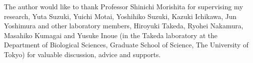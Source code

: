 The author would like to thank Professor Shinichi Morishita for supervising my research, Yuta Suzuki, Yuichi Motai, Yoshihiko Suzuki, Kazuki Ichikawa, Jun Yoshimura and other laboratory members, Hiroyuki Takeda, Ryohei Nakamura, Masahiko Kumagai and Yusuke Inoue (in the Takeda laboratory at the Department of Biological Sciences, Graduate School of Science, The University of Tokyo) for valuable discussion, advice and supports.
